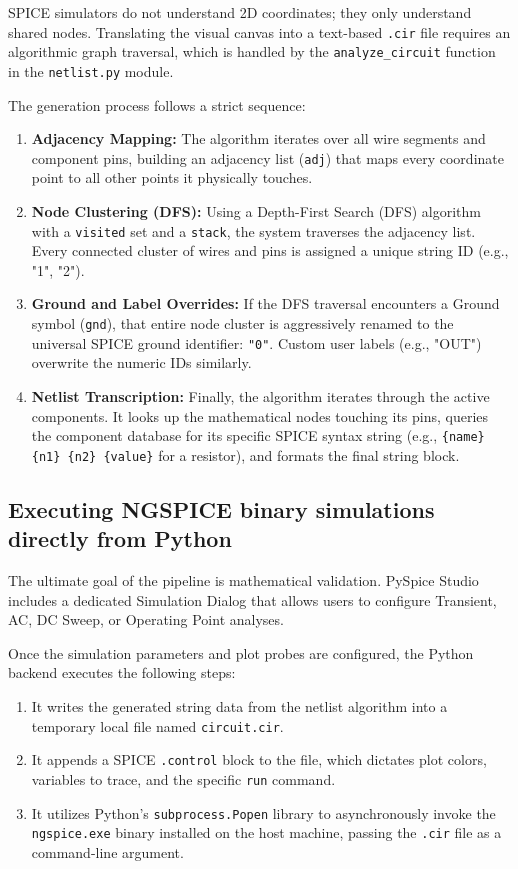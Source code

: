 \documentclass[12pt]{article}
\begin{document}
SPICE simulators do not understand 2D coordinates; they only understand shared nodes. Translating the visual canvas into a text-based \texttt{.cir} file requires an algorithmic graph traversal, which is handled by the \texttt{analyze\_circuit} function in the \texttt{netlist.py} module.

The generation process follows a strict sequence:
\begin{enumerate}
    \item \textbf{Adjacency Mapping:} The algorithm iterates over all wire segments and component pins, building an adjacency list (\texttt{adj}) that maps every coordinate point to all other points it physically touches.
    \item \textbf{Node Clustering (DFS):} Using a Depth-First Search (DFS) algorithm with a \texttt{visited} set and a \texttt{stack}, the system traverses the adjacency list. Every connected cluster of wires and pins is assigned a unique string ID (e.g., "1", "2"). 
    \item \textbf{Ground and Label Overrides:} If the DFS traversal encounters a Ground symbol (\texttt{gnd}), that entire node cluster is aggressively renamed to the universal SPICE ground identifier: \texttt{"0"}. Custom user labels (e.g., "OUT") overwrite the numeric IDs similarly.
    \item \textbf{Netlist Transcription:} Finally, the algorithm iterates through the active components. It looks up the mathematical nodes touching its pins, queries the component database for its specific SPICE syntax string (e.g., \texttt{\{name\} \{n1\} \{n2\} \{value\}} for a resistor), and formats the final string block.
\end{enumerate}

\subsection{Executing NGSPICE binary simulations directly from Python}

The ultimate goal of the pipeline is mathematical validation. PySpice Studio includes a dedicated Simulation Dialog that allows users to configure Transient, AC, DC Sweep, or Operating Point analyses. 

Once the simulation parameters and plot probes are configured, the Python backend executes the following steps:
\begin{enumerate}
    \item It writes the generated string data from the netlist algorithm into a temporary local file named \texttt{circuit.cir}.
    \item It appends a SPICE \texttt{.control} block to the file, which dictates plot colors, variables to trace, and the specific \texttt{run} command.
    \item It utilizes Python's \texttt{subprocess.Popen} library to asynchronously invoke the \texttt{ngspice.exe} binary installed on the host machine, passing the \texttt{.cir} file as a command-line argument.
\end{enumerate}
\end{document}
